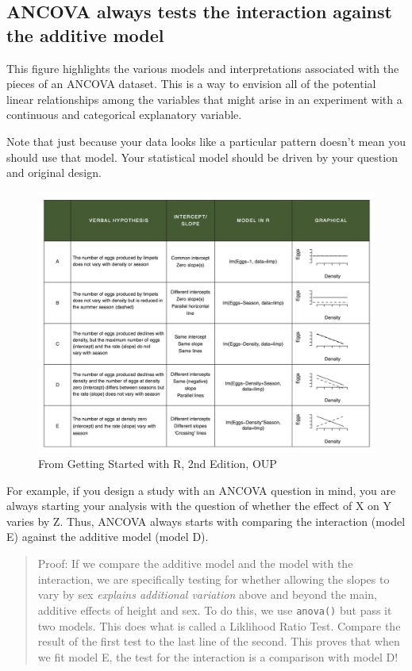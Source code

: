 \documentclass[
]{book}
\begin{document}
\hypertarget{ancova-always-tests-the-interaction-against-the-additive-model}{%
\subsection{ANCOVA always tests the interaction against the additive model}\label{ancova-always-tests-the-interaction-against-the-additive-model}}

This figure highlights the various models and interpretations associated with the pieces of an ANCOVA dataset. This is a way to envision all of the potential linear relationships among the variables that might arise in an experiment with a continuous and categorical explanatory variable.

Note that just because your data looks like a particular pattern doesn't mean you should use that model. Your statistical model should be driven by your question and original design.

\begin{figure}
\includegraphics[width=20.56in]{images/GSwithR_Grid} \caption{From Getting Started with R, 2nd Edition, OUP}\label{fig:unnamed-chunk-60}
\end{figure}

For example, if you design a study with an ANCOVA question in mind, you are always starting your analysis with the question of whether the effect of X on Y varies by Z. Thus, ANCOVA always starts with comparing the interaction (model E) against the additive model (model D).

\begin{quote}
Proof: If we compare the additive model and the model with the interaction, we are specifically testing for whether allowing the slopes to vary by sex \emph{explains additional variation} above and beyond the main, additive effects of height and sex. To do this, we use \texttt{anova()} but pass it two models. This does what is called a Liklihood Ratio Test.
Compare the result of the first test to the last line of the second. This proves that when we fit model E, the test for the interaction is a comparison with model D!
\end{quote}
\end{document}
